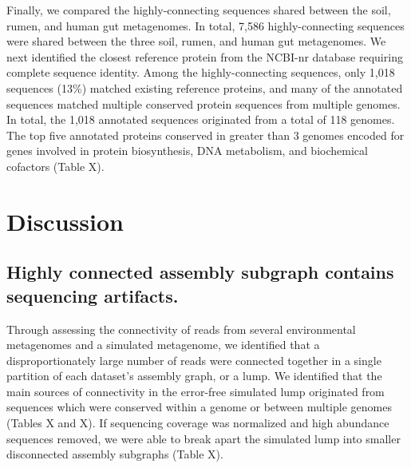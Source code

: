 \documentclass[11pt]{article} %
\begin{document}
Finally, we compared the highly-connecting sequences shared between the soil, rumen, and human gut metagenomes.  In total, 7,586 highly-connecting sequences were shared between the three soil, rumen, and human gut metagenomes.  We next identified the closest reference protein from the NCBI-nr database requiring complete sequence identity.  Among the highly-connecting sequences, only 1,018 sequences (13\%) matched existing reference proteins, and many of the annotated sequences matched multiple conserved protein sequences from multiple genomes.  In total, the 1,018 annotated sequences originated from a total of 118 genomes.  The top five annotated proteins conserved in greater than 3 genomes encoded for genes involved in protein biosynthesis, DNA metabolism, and biochemical cofactors (Table X).

\section{Discussion}

\subsection{Highly connected assembly subgraph contains sequencing artifacts.}

Through assessing the connectivity of reads from several environmental metagenomes and a simulated metagenome, we identified that a disproportionately large number of reads were connected together in a single partition of each dataset's assembly graph, or a lump.   We identified that the main sources of connectivity in the error-free simulated lump originated from sequences which were conserved within a genome or between multiple genomes (Tables X and X).  If sequencing coverage was normalized and high abundance sequences removed, we were able to break apart the simulated lump into smaller disconnected assembly subgraphs (Table X).  
\end{document}
